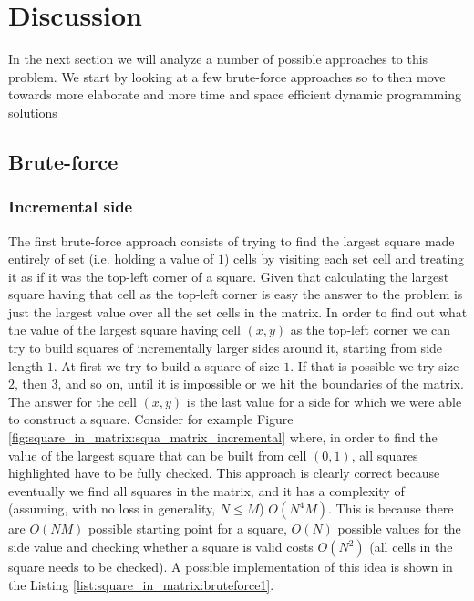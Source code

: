 \section{Discussion}
\label{square_in_matrix:sec:discussion}
In the next section we will analyze a number of possible approaches to this problem. We start by
looking at a few brute-force approaches so to then move towards more elaborate and more time and
space efficient dynamic programming solutions

\subsection{Brute-force}
\subsubsection{Incremental side}
\label{square_in_matrix:sec:incremental_side}
The first brute-force approach consists of trying to find the largest square made entirely of set
(i.e. holding a value of $1$) cells by visiting each set cell and treating it as if it was the
top-left corner of a square. Given that calculating the largest square having that cell as the top-left
corner is easy the answer to the problem is just the largest value over all the set cells in the
matrix. In order to find out what the value of the largest square having cell $(x,y)$ as the top-left
corner we can try to build squares of incrementally larger sides around it, starting from side length
$1$. At first we try to build a square of size $1$. If that is possible we try size $2$, then $3$,
and so on, until it is impossible or we hit the boundaries of the matrix. The answer for the cell
$(x,y)$ is the last value for a side for which we were able to construct a square. Consider for
example Figure \ref{fig:square_in_matrix:squa_matrix_incremental} where, in order to find the value
of the largest square that can be built from cell $(0,1)$, all squares highlighted have to be fully
checked. This approach is clearly correct because eventually we find all squares in the matrix, and
it has a complexity of (assuming, with no loss in generality, $N \leq M$) $O(N^4M)$. This is because
there are $O(NM)$ possible starting point for a square, $O(N)$ possible values for the side value
and checking whether a square is valid costs $O(N^2)$ (all cells in the square needs to be checked).
A possible implementation of this idea is shown in the Listing
\ref{list:square_in_matrix:bruteforce1}.





